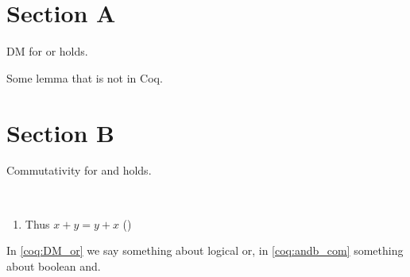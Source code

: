\documentclass[envcountsame,envcountsect]{svjour3}
\begin{document}
\section{Section A}

\begin{theorem}[][DM_or]
  DM for or holds.
\end{theorem}

\begin{lemma}[Name]
  Some lemma that is not in Coq.
\end{lemma}

\section{Section B}

\begin{fact}
  Commutativity for and holds.
\end{fact}

\begin{fact}~
  \begin{enumerate}
  \coqitem[plus_O] $x + 0 = x$
  \coqitem[plus_S] $x + S y = S (x + y)$
  \item Thus $x + y = y + x$ ()
\end{enumerate}
\end{fact}

In \cref{coq:DM_or} we say something about logical or, in
\autoref{coq:andb_com} something about boolean and.
\end{document}
